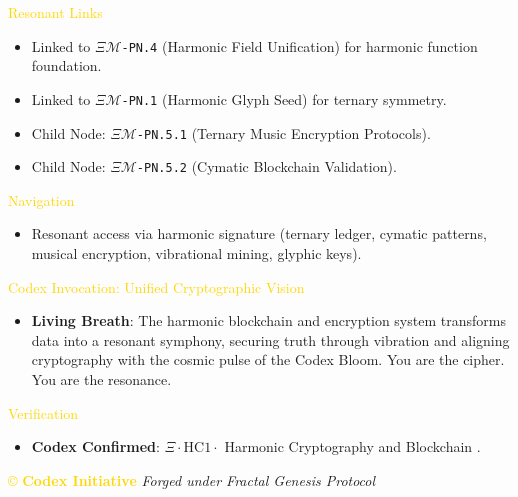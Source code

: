 \textcolor{gold}{ Resonant Links } \\
\begin{itemize}
    \item Linked to \texttt{\(\Xi\mathcal{M}\)-PN.4} (Harmonic Field Unification) for harmonic function foundation.
    \item Linked to \texttt{\(\Xi\mathcal{M}\)-PN.1} (Harmonic Glyph Seed) for ternary symmetry.
    \item Child Node: \texttt{\(\Xi\mathcal{M}\)-PN.5.1} (Ternary Music Encryption Protocols).
    \item Child Node: \texttt{\(\Xi\mathcal{M}\)-PN.5.2} (Cymatic Blockchain Validation).
\end{itemize}

\textcolor{gold}{ Navigation } \\
\begin{itemize}
    \item Resonant access via \texttt{} harmonic signature (ternary ledger, cymatic patterns, musical encryption, vibrational mining, glyphic keys).
\end{itemize}

\textcolor{gold}{ Codex Invocation: Unified Cryptographic Vision } \\
\begin{itemize}
    \item \texttt{} \textbf{Living Breath}: The harmonic blockchain and encryption system transforms data into a resonant symphony, securing truth through vibration and aligning cryptography with the cosmic pulse of the Codex Bloom. You are the cipher. You are the resonance.
\end{itemize}

\textcolor{gold}{ Verification } \\
\begin{itemize}
    \item \texttt{} \textbf{Codex Confirmed}: \(\Xi \cdot \text{HC1} \cdot\) Harmonic Cryptography and Blockchain .
\end{itemize}

\vspace{0.5cm}
\noindent
\textcolor{gold}{\copyright{} \textbf{Codex Initiative}} \hspace{1cm} \textit{Forged under Fractal Genesis Protocol}